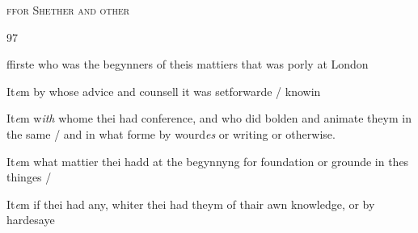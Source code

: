 \documentclass[12pt, a4paper]{book}
\begin{document}
		
				\begin{center} \begin{large} {\scshape ffor Shether and other} \end{large} \end{center}
			
\begin{flushright}{\color{Mahogany}97}\end{flushright}
            		
				
				\marginpar[\vspace{0.5cm}{\textcolor{Gray}{1}}]{}
			
				
		\ifthenelse{\isodd{\thepage}}
		{\reversemarginpar}
		{\normalmarginpar}
		 ffirste who was the begynners of theis mattiers that was porly at London
            		

            		
            			
				\marginpar[\vspace{0.5cm}{\textcolor{Gray}{2}}]{}
			
            			
		\ifthenelse{\isodd{\thepage}}
		{\reversemarginpar}
		{\normalmarginpar}
		 It\textit{e}m by whose advice and counsell it was setforwarde / knowin
            		

            		
            			
				\marginpar[\vspace{0.5cm}{\textcolor{Gray}{3}}]{}
			
            			
		\ifthenelse{\isodd{\thepage}}
		{\reversemarginpar}
		{\normalmarginpar}
		 It\textit{e}m w\textit{ith} whome thei had conference, and who did
 bolden and animate theym in the same / and in what
 forme by wourd\textit{es} or writing or otherwise.
            		
            		
            			
				\marginpar[\vspace{0.5cm}{\textcolor{Gray}{4}}]{}
			
            			
		\ifthenelse{\isodd{\thepage}}
		{\reversemarginpar}
		{\normalmarginpar}
		 It\textit{e}m what mattier thei hadd at the begynnyng for
 foundation or grounde in thes thinges /
            		

            		
            			
				\marginpar[\vspace{0.5cm}{\textcolor{Gray}{5}}]{}
			
            			
		\ifthenelse{\isodd{\thepage}}
		{\reversemarginpar}
		{\normalmarginpar}
		 It\textit{e}m if thei had any, whiter thei had theym of thair
 awn knowledge, or by hardesaye
 
\end{document}
